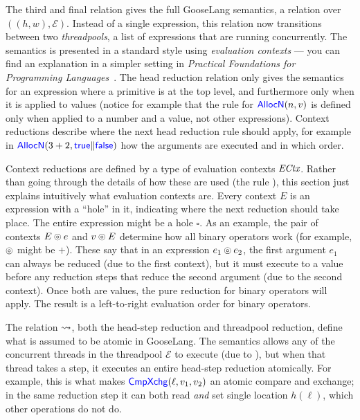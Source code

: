 The third and final relation gives the full GooseLang semantics, a relation over
$((h, w), \mathcal{E})$. Instead of a
single expression, this relation now transitions between two \emph{threadpools},
a list of expressions that are
running concurrently. The semantics is presented in a standard style using
\emph{evaluation contexts} --- you can find an explanation in a simpler setting
in \emph{Practical Foundations for Programming Languages}~\cite[\S
5.3]{harper:pfpl}. The head reduction relation only gives the semantics for an
expression where a primitive is at the top level, and furthermore only when it is
applied to values (notice for example that the rule for $\mathsf{\textcolor{blue}{AllocN}}(n, v)$
is defined only when applied to a number and a value, not other expressions).
Context reductions describe where the next head reduction rule should apply, for
example in $\mathsf{\textcolor{blue}{AllocN}}(3+2, \mathsf{\textcolor{blue}{true}} \| \mathsf{\textcolor{blue}{false}})$ how the arguments
are executed and in which order.

Context reductions are defined by a type of evaluation contexts
$\textit{ECtx}$. Rather than going through the details of how these are used
(the rule ), this section just explains intuitively what
evaluation contexts are. Every context $E$ is an expression with a ``hole'' in
it, indicating where the next reduction should take place. The entire expression
might be a hole $\square$. As an example, the pair of contexts $E \circledcirc e$ and
$v \circledcirc E$ determine how all binary operators work (for example, $\circledcirc$
might be $+$). These say that in an expression $e_{1} \circledcirc e_{2}$, the first argument
$e_{1}$ can always be reduced (due to the first context), but it must execute
to a value before any reduction steps that reduce the second argument (due to
the second context). Once both are values, the pure reduction for binary
operators will apply. The result is a left-to-right evaluation order for binary
operators.

The relation $\rightsquigarrow$, both the head-step reduction and threadpool reduction,
define what is assumed to be atomic in GooseLang. The semantics allows any of
the concurrent threads in the threadpool $\mathcal{E}$ to execute (due to
), but when that thread takes a step, it executes an
entire head-step reduction atomically. For example, this is what makes
$\mathsf{\textcolor{blue}{CmpXchg}}(\ell, v_1, v_2)$ an atomic compare and exchange; in the same
reduction step it can both read \emph{and} set single location $h(\ell)$, which
other operations do not do.

